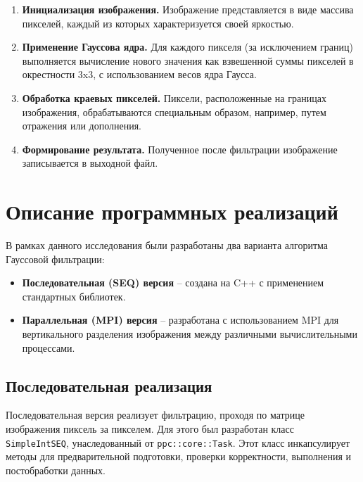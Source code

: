 \documentclass[12pt]{article}
\begin{document}
\begin{enumerate}
    \item \textbf{Инициализация изображения.} Изображение представляется в виде массива пикселей, каждый из которых характеризуется своей яркостью.
    
    \item \textbf{Применение Гауссова ядра.} Для каждого пикселя (за исключением границ) выполняется вычисление нового значения как взвешенной суммы пикселей в окрестности 3x3, с использованием весов ядра Гаусса.
    
    \item \textbf{Обработка краевых пикселей.}  Пиксели, расположенные на границах изображения, обрабатываются специальным образом, например, путем отражения или дополнения.
    
    \item \textbf{Формирование результата.} Полученное после фильтрации изображение записывается в выходной файл.
\end{enumerate}


\section{Описание программных реализаций}

В рамках данного исследования были разработаны два варианта алгоритма Гауссовой фильтрации:
\begin{itemize}
    \item \textbf{Последовательная (SEQ) версия} – создана на C++ с применением стандартных библиотек.
    \item \textbf{Параллельная (MPI) версия} – разработана с использованием MPI для вертикального разделения изображения между различными вычислительными процессами.
\end{itemize}

\subsection{Последовательная реализация}

Последовательная версия реализует фильтрацию, проходя по матрице изображения пиксель за пикселем. Для этого был разработан класс \texttt{SimpleIntSEQ}, унаследованный от \texttt{ppc::core::Task}. Этот класс инкапсулирует методы для предварительной подготовки, проверки корректности, выполнения и постобработки данных.
\end{document}
